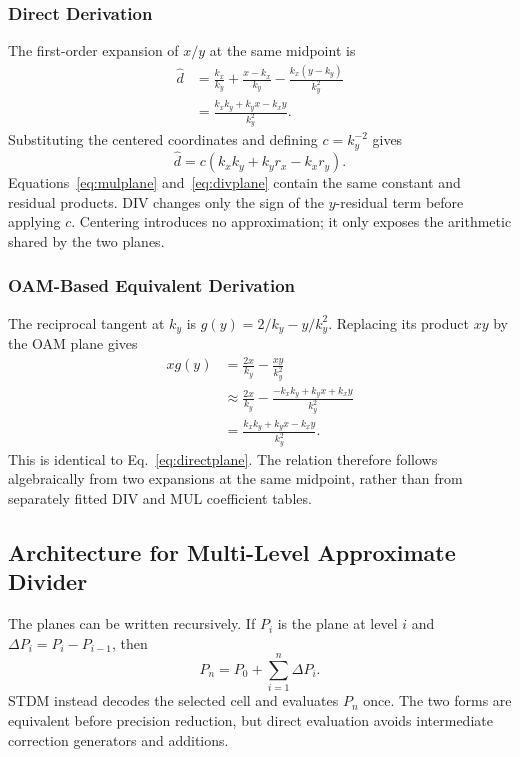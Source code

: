 \documentclass[conference]{IEEEtran}
\begin{document}
\subsubsection{Direct Derivation}
The first-order expansion of $x/y$ at the same midpoint is
\begin{equation}
\begin{aligned}
\widehat d
&=\frac{k_x}{k_y}+\frac{x-k_x}{k_y}
  -\frac{k_x(y-k_y)}{k_y^2}\\
&=\frac{k_xk_y+k_yx-k_xy}{k_y^2}.
\end{aligned}
\label{eq:directplane}
\end{equation}
Substituting the centered coordinates and defining $c=k_y^{-2}$ gives
\begin{equation}
\widehat d=c(k_xk_y+k_yr_x-k_xr_y).
\label{eq:divplane}
\end{equation}
Equations~\eqref{eq:mulplane} and~\eqref{eq:divplane} contain the same
constant and residual products. DIV changes only the sign of the
$y$-residual term before applying $c$. Centering introduces no approximation;
it only exposes the arithmetic shared by the two planes.

\subsubsection{OAM-Based Equivalent Derivation}
The reciprocal tangent at $k_y$ is
$g(y)=2/k_y-y/k_y^2$. Replacing its product $xy$ by the OAM plane gives
\begin{equation}
\begin{aligned}
xg(y)
&=\frac{2x}{k_y}-\frac{xy}{k_y^2}\\
&\approx\frac{2x}{k_y}
-\frac{-k_xk_y+k_yx+k_xy}{k_y^2}\\
&=\frac{k_xk_y+k_yx-k_xy}{k_y^2}.
\end{aligned}
\label{eq:oamlink}
\end{equation}
This is identical to Eq.~\eqref{eq:directplane}. The relation therefore
follows algebraically from two expansions at the same midpoint, rather than
from separately fitted DIV and MUL coefficient tables.

\subsection{Architecture for Multi-Level Approximate Divider}
The planes can be written recursively. If $P_i$ is the plane at level $i$ and
$\Delta P_i=P_i-P_{i-1}$, then
\begin{equation}
P_n=P_0+\sum_{i=1}^{n}\Delta P_i.
\label{eq:corrections}
\end{equation}
STDM instead decodes the selected cell and evaluates $P_n$ once. The two
forms are equivalent before precision reduction, but direct evaluation avoids
intermediate correction generators and additions.
\end{document}
